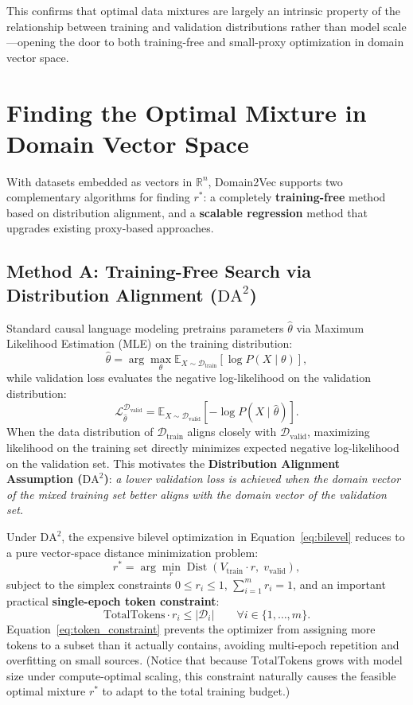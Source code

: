 \documentclass[12pt]{article}
\begin{document}
This confirms that optimal data mixtures are largely an intrinsic property of the relationship between training and validation distributions rather than model scale—opening the door to both training-free and small-proxy optimization in domain vector space.

\section*{Finding the Optimal Mixture in Domain Vector Space}

With datasets embedded as vectors in $\mathbb{R}^n$, Domain2Vec supports two complementary algorithms for finding $r^*$: a completely \textbf{training-free} method based on distribution alignment, and a \textbf{scalable regression} method that upgrades existing proxy-based approaches.

\subsection*{Method A: Training-Free Search via Distribution Alignment ($\mathrm{DA}^2$)}

Standard causal language modeling pretrains parameters $\hat{\theta}$ via Maximum Likelihood Estimation (MLE) on the training distribution:
\[
\hat{\theta} = \arg\max_{\theta} \mathbb{E}_{X \sim \mathcal{D}_{\text{train}}} \left[ \log P(X \mid \theta) \right],
\]
while validation loss evaluates the negative log-likelihood on the validation distribution:
\[
\mathcal{L}_{\hat{\theta}}^{\mathcal{D}_{\text{valid}}} = \mathbb{E}_{X \sim \mathcal{D}_{\text{valid}}} \left[ -\log P(X \mid \hat{\theta}) \right].
\]
When the data distribution of $\mathcal{D}_{\text{train}}$ aligns closely with $\mathcal{D}_{\text{valid}}$, maximizing likelihood on the training set directly minimizes expected negative log-likelihood on the validation set. This motivates the \textbf{Distribution Alignment Assumption ($\mathrm{DA}^2$)}: \emph{a lower validation loss is achieved when the domain vector of the mixed training set better aligns with the domain vector of the validation set.}

Under $\mathrm{DA}^2$, the expensive bilevel optimization in Equation~\eqref{eq:bilevel} reduces to a pure vector-space distance minimization problem:
\begin{equation}
r^* = \arg\min_{r} \operatorname{Dist}\!\left(V_{\text{train}} \cdot r,\; v_{\text{valid}}\right),
\label{eq:da2}
\end{equation}
subject to the simplex constraints $0 \le r_i \le 1$, $\sum_{i=1}^m r_i = 1$, and an important practical \textbf{single-epoch token constraint}:
\begin{equation}
\mathrm{TotalTokens} \cdot r_i \le |\mathcal{D}_i| \qquad \forall i \in \{1, \dots, m\}.
\label{eq:token_constraint}
\end{equation}
Equation~\eqref{eq:token_constraint} prevents the optimizer from assigning more tokens to a subset than it actually contains, avoiding multi-epoch repetition and overfitting on small sources. (Notice that because $\mathrm{TotalTokens}$ grows with model size under compute-optimal scaling, this constraint naturally causes the feasible optimal mixture $r^*$ to adapt to the total training budget.)
\end{document}
